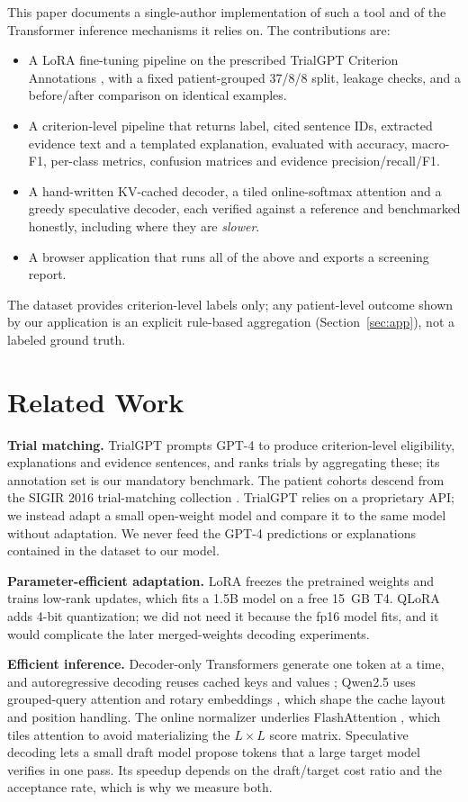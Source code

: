 \documentclass[conference]{IEEEtran}
\begin{document}
This paper documents a single-author implementation of such a tool and of the Transformer inference mechanisms it relies on. The contributions are:
\begin{itemize}
\item A LoRA fine-tuning pipeline on the prescribed TrialGPT Criterion Annotations \cite{jin2024trialgpt}, with a fixed patient-grouped 37/8/8 split, leakage checks, and a before/after comparison on identical examples.
\item A criterion-level pipeline that returns label, cited sentence IDs, extracted evidence text and a templated explanation, evaluated with accuracy, macro-F1, per-class metrics, confusion matrices and evidence precision/recall/F1.
\item A hand-written KV-cached decoder, a tiled online-softmax attention and a greedy speculative decoder, each verified against a reference and benchmarked honestly, including where they are \emph{slower}.
\item A browser application that runs all of the above and exports a screening report.
\end{itemize}
The dataset provides criterion-level labels only; any patient-level outcome shown by our application is an explicit rule-based aggregation (Section~\ref{sec:app}), not a labeled ground truth.

\section{Related Work}
\textbf{Trial matching.} TrialGPT \cite{jin2024trialgpt} prompts GPT-4 to produce criterion-level eligibility, explanations and evidence sentences, and ranks trials by aggregating these; its annotation set is our mandatory benchmark. The patient cohorts descend from the SIGIR 2016 trial-matching collection \cite{koopman2016test}. TrialGPT relies on a proprietary API; we instead adapt a small open-weight model and compare it to the same model without adaptation. We never feed the GPT-4 predictions or explanations contained in the dataset to our model.

\textbf{Parameter-efficient adaptation.} LoRA \cite{hu2022lora} freezes the pretrained weights and trains low-rank updates, which fits a 1.5B model on a free 15~GB T4. QLoRA \cite{dettmers2023qlora} adds 4-bit quantization; we did not need it because the fp16 model fits, and it would complicate the later merged-weights decoding experiments.

\textbf{Efficient inference.} Decoder-only Transformers \cite{vaswani2017attention} generate one token at a time, and autoregressive decoding reuses cached keys and values \cite{pope2023efficiently}; Qwen2.5 uses grouped-query attention \cite{ainslie2023gqa} and rotary embeddings \cite{su2024roformer}, which shape the cache layout and position handling. The online normalizer \cite{milakov2018online} underlies FlashAttention \cite{dao2022flashattention}, which tiles attention to avoid materializing the $L\times L$ score matrix. Speculative decoding \cite{leviathan2023fast,chen2023accelerating} lets a small draft model propose tokens that a large target model verifies in one pass. Its speedup depends on the draft/target cost ratio and the acceptance rate, which is why we measure both.
\end{document}
